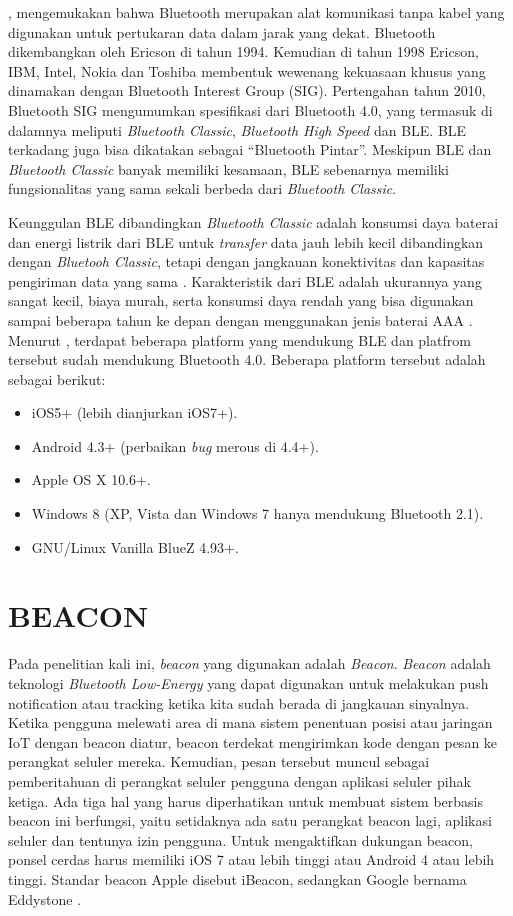 \cite{Keluza2017}, mengemukakan bahwa Bluetooth merupakan alat komunikasi tanpa kabel yang digunakan untuk pertukaran data dalam jarak yang dekat. Bluetooth dikembangkan oleh Ericson di tahun 1994. Kemudian di tahun 1998 Ericson, IBM, Intel, Nokia dan Toshiba membentuk wewenang kekuasaan khusus yang dinamakan dengan Bluetooth Interest Group (SIG). Pertengahan tahun 2010, Bluetooth SIG mengumumkan spesifikasi dari Bluetooth 4.0, yang termasuk di dalamnya meliputi \textit{Bluetooth Classic}, \textit{Bluetooth High Speed} dan BLE. BLE terkadang juga bisa dikatakan sebagai “Bluetooth Pintar”. Meskipun BLE dan \textit{Bluetooth Classic} banyak memiliki kesamaan, BLE sebenarnya memiliki fungsionalitas yang sama sekali berbeda dari \textit{Bluetooth Classic}.

\par Keunggulan BLE dibandingkan \textit{Bluetooth Classic} adalah konsumsi daya baterai dan energi listrik dari BLE untuk \textit{transfer} data jauh lebih kecil dibandingkan dengan \textit{Bluetooh Classic}, tetapi dengan jangkauan konektivitas dan kapasitas pengiriman data yang sama \citep{bluetoothsig2010}. Karakteristik dari BLE adalah ukurannya yang sangat kecil, biaya murah, serta konsumsi daya rendah yang bisa digunakan sampai beberapa tahun ke depan dengan menggunakan jenis baterai AAA \citep{Keluza2017}. Menurut \cite{Paganini2015}, terdapat beberapa platform yang mendukung BLE dan platfrom tersebut sudah mendukung Bluetooth 4.0. Beberapa platform tersebut adalah sebagai berikut:
\begin {itemize}
\itemsep0em
\item iOS5+ (lebih dianjurkan iOS7+).
\item Android 4.3+ (perbaikan \textit{bug} merous di 4.4+).
\item Apple OS X 10.6+.
\item Windows 8 (XP, Vista dan Windows 7 hanya mendukung Bluetooth 2.1).
\item GNU/Linux Vanilla BlueZ 4.93+.
\end{itemize}

\section{\uppercase{BEACON}}
\par Pada penelitian kali ini, \textit{beacon} yang digunakan adalah \textit{Beacon}. \textit{Beacon} adalah teknologi \textit{Bluetooth Low-Energy} yang dapat digunakan untuk melakukan push notification atau tracking ketika kita sudah berada di jangkauan sinyalnya. Ketika pengguna melewati area di mana sistem penentuan posisi atau jaringan IoT dengan beacon diatur, beacon terdekat mengirimkan kode dengan pesan ke perangkat seluler mereka. Kemudian, pesan tersebut muncul sebagai pemberitahuan di perangkat seluler pengguna dengan aplikasi seluler pihak ketiga. Ada tiga hal yang harus diperhatikan untuk membuat sistem berbasis beacon ini berfungsi, yaitu setidaknya ada satu perangkat beacon lagi, aplikasi seluler dan tentunya izin pengguna. Untuk mengaktifkan dukungan beacon, ponsel cerdas harus memiliki iOS 7 atau lebih tinggi atau Android 4 atau lebih tinggi. Standar beacon Apple disebut iBeacon, sedangkan Google bernama Eddystone \citep{Kim2014}.

